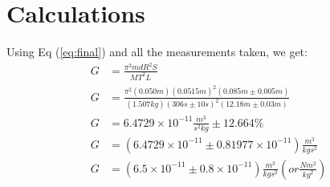 \documentclass[12pt]{article}
\begin{document}
\newpage
    \section*{Calculations}
    Using Eq (\ref{eq:final}) and all the measurements taken, we get:
    \begin{equation*}
        \begin{aligned}
            G&=\frac{\pi^2mdR^2S}{MT^2L}\\
            G&=\frac{\pi^2(0.050m)(0.0515m)^2(0.085\si{m} \pm 0.005\si{m})}{(1.507kg)(306\si{s} \pm 10\si{s})^2(12.18\si{m} \pm 0.03 \si{m})}\\
            G&=6.4729 \times 10^{-11}\frac{\si{m^3}}{\si{s^2kg}}\pm 12.664\% \\
            G&=(6.4729 \times 10^{-11}\pm 0.81977 \times 10^{-11})\frac{\si{m^3}}{\si{kgs^2}}\\
            G&=(6.5 \times 10^{-11}\pm 0.8 \times 10^{-11})\frac{\si{m^3}}{\si{kgs^2}}( or \frac{\si{Nm^2}}{\si{kg^2}} )\\
        \end{aligned}
    \end{equation*}



   
\end{document}
